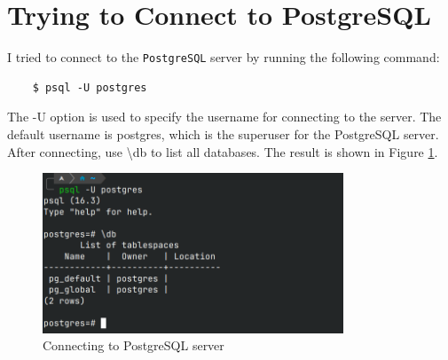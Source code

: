 \documentclass{cshwk}
\begin{document}
\section{Trying to Connect to PostgreSQL}
I tried to connect to the \texttt{PostgreSQL} server by running the following command:
\begin{verbatim}
    $ psql -U postgres
\end{verbatim}

The -U option is used to specify the username for connecting to the server. The default username is postgres, which is the superuser for the PostgreSQL server. After connecting, use \textbackslash db to list all databases. The result is shown in Figure \ref{fig:connect}.

\begin{figure}[htbp]
    \centering
    \includegraphics[width=0.8\textwidth]{hw1-3.png}
    \caption{Connecting to PostgreSQL server}
    \label{fig:connect}
\end{figure}
\end{document}
